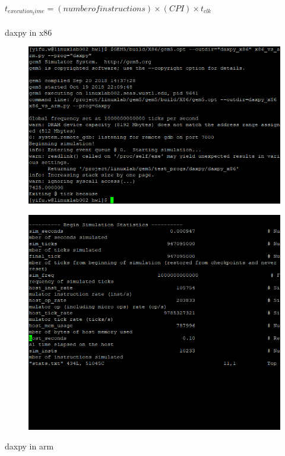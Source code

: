 \documentclass{article}
\begin{document}
\maketitle
$t_{execution_time}=(number of instructions)\times(CPI)\times t_{clk}$\\
\\
daxpy in x86
\begin{figure}[H]\centering\includegraphics{1.png}\end{figure}
\begin{figure}[H]\centering\includegraphics{9.png}\end{figure}
daxpy in arm
\end{document}
